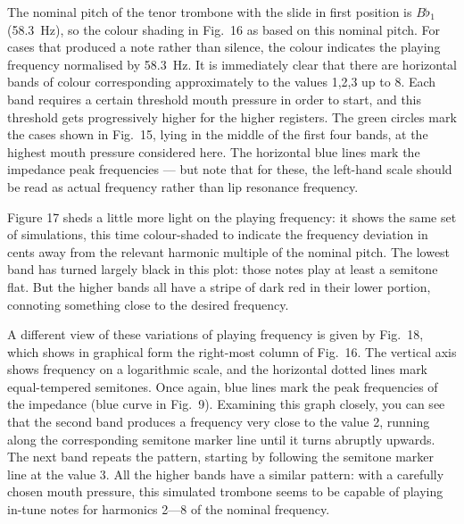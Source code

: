 
  The nominal pitch of the tenor trombone with the slide in first position is 
  $B\flat_1$ (58.3~Hz), so the colour shading in Fig.\ 16 as based on this 
  nominal pitch. For cases that produced a note rather than silence, the colour 
  indicates the playing frequency normalised by 58.3~Hz. It is immediately 
  clear that there are horizontal bands of colour corresponding approximately 
  to the values 1,2,3 up to 8. Each band requires a certain threshold mouth 
  pressure in order to start, and this threshold gets progressively higher for 
  the higher registers. The green circles mark the cases shown in Fig.\ 15, 
  lying in the middle of the first four bands, at the highest mouth pressure 
  considered here. The horizontal blue lines mark the impedance peak 
  frequencies --- but note that for these, the left-hand scale should be read 
  as actual frequency rather than lip resonance frequency. 

  Figure 17 sheds a little more light on the playing frequency: it shows the 
  same set of simulations, this time colour-shaded to indicate the frequency 
  deviation in cents away from the relevant harmonic multiple of the nominal 
  pitch. The lowest band has turned largely black in this plot: those notes 
  play at least a semitone flat. But the higher bands all have a stripe of dark 
  red in their lower portion, connoting something close to the desired 
  frequency. 


  A different view of these variations of playing frequency is given by Fig.\ 
  18, which shows in graphical form the right-most column of Fig.\ 16. The 
  vertical axis shows frequency on a logarithmic scale, and the horizontal 
  dotted lines mark equal-tempered semitones. Once again, blue lines mark the 
  peak frequencies of the impedance (blue curve in Fig.\ 9). Examining this 
  graph closely, you can see that the second band produces a frequency very 
  close to the value 2, running along the corresponding semitone marker line 
  until it turns abruptly upwards. The next band repeats the pattern, starting 
  by following the semitone marker line at the value 3. All the higher bands 
  have a similar pattern: with a carefully chosen mouth pressure, this 
  simulated trombone seems to be capable of playing in-tune notes for harmonics 
  2—8 of the nominal frequency. 

